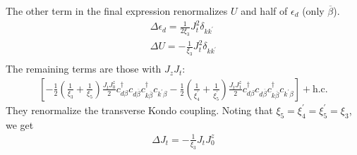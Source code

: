 \documentclass[twoside]{report}
\numberwithin{equation}{section}
\begin{document}
The other term in the final expression renormalizes \(U\) and half of \(\epsilon_d\) (only \(\overline\beta\)).
\begin{equation}\begin{aligned}
	\label{edU3}
	\Delta \epsilon_d = \frac{1}{2\xi_3}J_t^2 \delta_{kk^\prime}\\
	\Delta U = -\frac{1}{\xi_3}J_t^2\delta_{kk^\prime}\\
\end{aligned}\end{equation}
The remaining terms are those with \(J_z J_t\):
\begin{equation}\begin{aligned}
	\left[-\frac{1}{2}\left(\frac{1}{\xi_3} + \frac{1}{\xi_5}\right)\frac{J_t J^z_0}{2}c^\dagger_{d\beta}c_{d\overline\beta}c^\dagger_{k\overline\beta}c_{k^\prime\beta}-\frac{1}{2}\left(\frac{1}{\xi^\prime_4} + \frac{1}{\xi^\prime_5}\right)\frac{J_t J^z_1}{2}c^\dagger_{d\beta}c_{d\overline\beta}c^\dagger_{k\overline\beta}c_{k^\prime\beta}\right] + \text{h.c.}
\end{aligned}\end{equation}
They renormalize the transverse Kondo coupling. Noting that \(\xi_5 = \xi_4^\prime = \xi_5^\prime = \xi_3\), we get
\begin{equation}\begin{aligned}
	\label{Jt}
	\Delta J_t = -\frac{1}{\xi_3}J_t J^z_0
\end{aligned}\end{equation}
\end{document}
